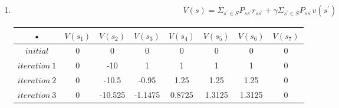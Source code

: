 \documentclass[12pt]{article}
\begin{document}
\begin{enumerate}
\item 
\begin{align}
V(s) = \Sigma_{s^{'} \in S} P_{ss^{'}} r_{ss^{'}} + \gamma \Sigma_{s^{'} \in S} P_{ss^{'}} v(s^{'})
\end{align}
\begin{tabular}{|c|c|c|c|c|c|c|c|}
\hline 
• & $V(s_1)$ & $V(s_2)$ & $V(s_3)$ & $V(s_4)$ & $V(s_5)$ & $V(s_6)$ & $V(s_7)$ \\ 
\hline 
$initial$ & 0 & 0 & 0 & 0 & 0 & 0 & 0 \\ 
\hline 
$iteration \ 1$ & 0 & -10 & 1 & 1 & 1 & 1 & 0 \\ 
\hline 
$iteration \ 2$ & 0 & -10.5 & -0.95 & 1.25 & 1.25 & 1.25 & 0 \\ 
\hline 
$iteration \ 3$ & 0 & -10.525 & -1.1475 & 0.8725 & 1.3125 & 1.3125 & 0 \\ 
\hline
\end{tabular} 


\end{enumerate}
\end{document}
